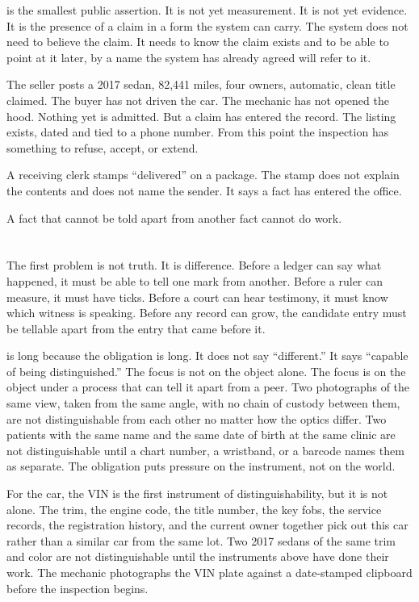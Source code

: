  is the smallest public assertion. It is not yet measurement. It
is not yet evidence. It is the presence of a claim in a form the system can
carry. The system does not need to believe the claim. It needs to know the
claim exists and to be able to point at it later, by a name the system has
already agreed will refer to it.

The seller posts a 2017 sedan, 82{,}441 miles, four owners, automatic, clean
title claimed. The buyer has not driven the car. The mechanic has not opened
the hood. Nothing yet is admitted. But a claim has entered the record. The
listing exists, dated and tied to a phone number. From this point the
inspection has something to refuse, accept, or extend.

A receiving clerk stamps ``delivered'' on a package. The stamp does not
explain the contents and does not name the sender. It says a fact has
entered the office.

A fact that cannot be told apart from another fact cannot do work.

\section{}
\label{se:distinguishable}

The first problem is not truth. It is difference. Before a ledger can say
what happened, it must be able to tell one mark from another. Before a ruler
can measure, it must have ticks. Before a court can hear testimony, it must
know which witness is speaking. Before any record can grow, the candidate
entry must be tellable apart from the entry that came before it.

 is long because the obligation is long. It does not
say ``different.'' It says ``capable of being distinguished.'' The focus is
not on the object alone. The focus is on the object under a process that can
tell it apart from a peer. Two photographs of the same view, taken from the
same angle, with no chain of custody between them, are not distinguishable
from each other no matter how the optics differ. Two patients with the same
name and the same date of birth at the same clinic are not distinguishable
until a chart number, a wristband, or a barcode names them as separate. The
obligation puts pressure on the instrument, not on the world.

For the car, the VIN is the first instrument of distinguishability, but it is
not alone. The trim, the engine code, the title number, the key fobs, the
service records, the registration history, and the current owner together
pick out this car rather than a similar car from the same lot. Two 2017
sedans of the same trim and color are not distinguishable until the
instruments above have done their work. The mechanic photographs the VIN
plate against a date-stamped clipboard before the inspection begins.

